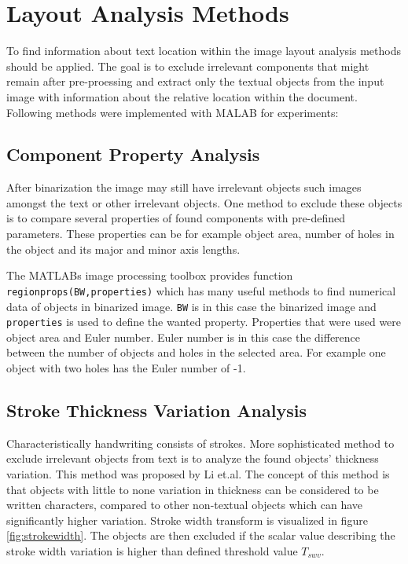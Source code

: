 \documentclass{article}
\def\code#1{\texttt{#1}}
\begin{document}
    \newpage
    \section{Layout Analysis Methods}
      To find information about text location within the image layout analysis methods should be applied. The goal is to exclude irrelevant components that might remain after pre-proessing and extract only the textual objects from the input image with information about the relative location within the document. Following methods were implemented with MALAB for experiments:

        \subsection{Component Property Analysis}
          After binarization the image may still have irrelevant objects such images amongst the text or other irrelevant objects. One method to exclude these objects is to compare several properties of found components with pre-defined parameters. These properties can be for example object area, number of holes in the object and its major and minor axis lengths.

          The MATLABs image processing toolbox  provides function \code{regionprops(BW,properties)} which has many useful methods to find numerical data of objects in binarized image. \code{BW} is in this case the binarized image and \code{properties} is used to define the wanted property. Properties that were used were object area and Euler number. Euler number is in this case the difference between the number of objects and holes in the selected area. For example one object with two holes has the Euler number of -1.

        \subsection{Stroke Thickness Variation Analysis}
          Characteristically handwriting consists of strokes. More sophisticated method to exclude irrelevant objects from text is to analyze the found objects' thickness variation. This method was proposed by Li et.al. \cite{Li} The concept of this method is that objects with little to none variation in thickness can be considered to be written characters, compared to other non-textual objects which can have significantly higher variation. Stroke width transform is visualized in figure \ref{fig:strokewidth}. The objects are then excluded if the scalar value describing the stroke width variation is higher than defined threshold value $T_{swv}$.
\end{document}
